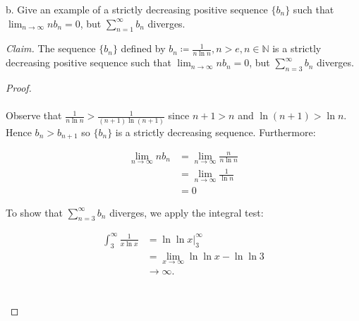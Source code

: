 b.  Give an example of a strictly decreasing positive sequence $\{b_n\}$ such
    that $\lim_{n \rightarrow \infty}{nb_n} = 0$, but
    $\sum\limits_{n=1}^{\infty}{b_n}$ diverges.
          
    \emph{Claim.} The sequence $\{b_n\}$ defined by 
    $b_n \coloneqq \frac{1}{n\ln{n}}, n > e, n \in \mathbb{N}$ is a strictly
    decreasing positive sequence such that 
    $\lim_{n \rightarrow \infty}{nb_n} = 0$, but
    $\sum\limits_{n=3}^{\infty}{b_n}$ diverges.

    \begin{proof}\ \\\\
        Observe that $\frac{1}{n\ln{n}} > \frac{1}{(n+1)\ln{(n+1)}}$ since 
        $n + 1 > n$ and $\ln{(n+1)} > \ln{n}$. Hence $b_{n} > b_{n+1}$ so
        $\{b_n\}$ is a strictly decreasing sequence. Furthermore:

        \begin{align*}
            \lim_{n \rightarrow \infty}{nb_n} &= \lim_{n \rightarrow \infty}{\frac{n}{n\ln{n}}} \\
                                              &= \lim_{n \rightarrow \infty}{\frac{1}{\ln{n}}} \\
                                              &= 0
        \end{align*}

        To show that $\sum\limits_{n=3}^{\infty}{b_n}$ diverges, we apply the
        integral test:

        \begin{align*}
            \int_3^\infty{\frac{1}{x\ln{x}}} &= \ln{\ln{x}}\rvert_3^\infty  \\
                                             &= \lim_{x \rightarrow \infty}{\ln{\ln{x}}} - \ln{\ln{3}} \\
                                             &\rightarrow \infty.
        \end{align*}
        \\\\
    \end{proof}